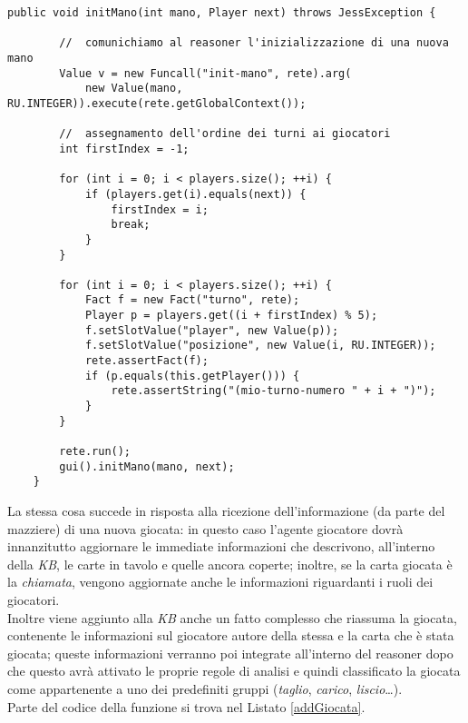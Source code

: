 \begin{lstlisting}[caption={il metodo \texttt{initMano} di PlayerAgent},label=initMano]
    public void initMano(int mano, Player next) throws JessException {

        //  comunichiamo al reasoner l'inizializzazione di una nuova mano
        Value v = new Funcall("init-mano", rete).arg(
            new Value(mano, RU.INTEGER)).execute(rete.getGlobalContext());

        //  assegnamento dell'ordine dei turni ai giocatori
        int firstIndex = -1;

        for (int i = 0; i < players.size(); ++i) {
            if (players.get(i).equals(next)) {
                firstIndex = i;
                break;
            }
        }

        for (int i = 0; i < players.size(); ++i) {
            Fact f = new Fact("turno", rete);
            Player p = players.get((i + firstIndex) % 5);
            f.setSlotValue("player", new Value(p));
            f.setSlotValue("posizione", new Value(i, RU.INTEGER));
            rete.assertFact(f);
            if (p.equals(this.getPlayer())) {
                rete.assertString("(mio-turno-numero " + i + ")");
            }
        }

        rete.run();
        gui().initMano(mano, next);
    }
\end{lstlisting}


\noindent
La stessa cosa succede in risposta alla ricezione dell'informazione (da parte del mazziere) di una nuova giocata: in questo caso l'agente giocatore dovrà innanzitutto aggiornare le immediate informazioni che descrivono, all'interno della \emph{KB}, le carte in tavolo e quelle ancora coperte; inoltre, se la carta giocata è la \emph{chiamata}, vengono aggiornate anche le informazioni riguardanti i ruoli dei giocatori.\\
Inoltre viene aggiunto alla \emph{KB} anche un fatto complesso che riassuma la giocata, contenente le informazioni sul giocatore autore della stessa e la carta che è stata giocata; queste informazioni verranno poi integrate all'interno del reasoner dopo che questo avrà attivato le proprie regole di analisi e quindi classificato la giocata come appartenente a uno dei predefiniti gruppi (\emph{taglio}, \emph{carico}, \emph{liscio}\dots).\\
Parte del codice della funzione si trova nel Listato \ref{addGiocata}.

